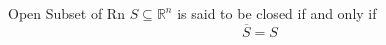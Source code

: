 \documentclass{standalone}
\begin{document}
\begin{defn*}{Open Subset of Rn}
  $ S \subseteq \mathbb{R}^{n} $ is said to be closed if and only if 
  \[
    \overline{S} = S
  \]
\end{defn*}
\end{document}
